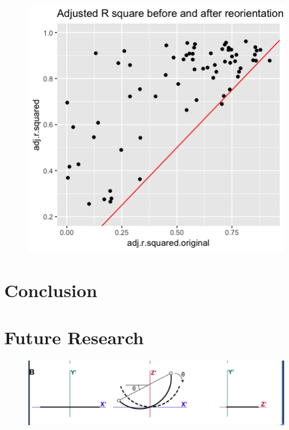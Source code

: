 \documentclass[10pt,letterpaper]{article}
\begin{document}
\begin{figure}[H]
\includegraphics[width=0.8\linewidth]{visualization_paper/adj_r2_before_after_yt} \end{figure}

\section{Conclusion}\label{conclusion}

\section{Future Research}\label{future-research}

\begin{figure}[H]
\includegraphics[width=0.9\linewidth]{visualization_paper/other_error} \end{figure}

\nolinenumbers
\end{document}
